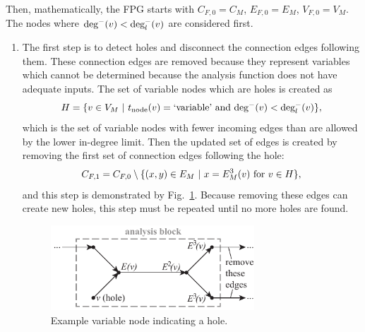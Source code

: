 Then, mathematically, the FPG starts with $C_{F,0} = C_M$, $E_{F,0} = E_M$, $V_{F,0} = V_M$.
The nodes where $\textrm{deg}^-(v) < \textrm{deg}_l^-(v)$ are considered first.
\begin{enumerate}
\item The first step is to detect holes and disconnect the connection edges following them. These connection edges are removed because they represent variables which cannot be determined because the analysis function does not have adequate inputs. The set of variable nodes which are holes is created as
\begin{equation}
H = \{v \in V_M \ | \  t_\textrm{node}(v) = \textrm{`variable'} \textrm{ and } \textrm{deg}^-(v) < \textrm{deg}_l^-(v) \},
\end{equation}
which is the set of variable nodes with fewer incoming edges than are allowed by the lower in-degree limit.
Then the updated set of edges is created by removing the first set of connection edges following the hole:
\begin{equation}
C_{F,1} = C_{F,0} \setminus \{(x,y) \in E_M \ | \  x=E_M^3(v) \textrm{ for } v \in H\},
\end{equation}
and this step is demonstrated by Fig.~\ref{f:hole}. Because removing these edges can create new holes, this step must be repeated until no more holes are found.
\begin{figure}[htb!]
	\begin{center}
	\includegraphics[width=3in]{images/analysis_block_hole}
	\end{center}
	\vspace{-20pt}
\caption{Example variable node indicating a hole.}
\label{f:hole}
\end{figure}


\end{enumerate}
